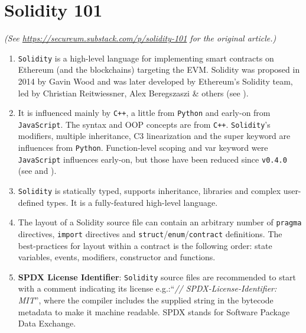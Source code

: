 \section{Solidity 101}

\textit{(See \url{https://secureum.substack.com/p/solidity-101} for the original article.)}\\

\begin{enumerate}

\item\verb|Solidity| is a high-level language for implementing smart contracts on Ethereum (and the blockchains) targeting the EVM. Solidity was proposed in 2014 by Gavin Wood and was later developed by Ethereum’s Solidity team, led by Christian Reitwiessner, Alex Beregszaszi \& others (see \cite{wikipedia_solidity}).

\item It is influenced mainly by \verb|C++|, a little from \verb|Python| and early-on from \verb|JavaScript|. The syntax and OOP concepts are from \verb|C++|. \verb|Solidity|’s modifiers, multiple inheritance, C3 linearization and the super keyword are influences from \verb|Python|. Function-level scoping and var keyword were \verb|JavaScript| influences early-on, but those have been reduced since \verb|v0.4.0| (see \cite{solidity_doc} and \cite{language_influences}).

\item\verb|Solidity| is statically typed, supports inheritance, libraries and complex user-defined types. It is a fully-featured high-level language.

\item The layout of a Solidity source file can contain an arbitrary number of \verb|pragma| directives, \verb|import| directives and \verb|struct|/\verb|enum|/\verb|contract| definitions. The best-practices for layout within a contract is the following order: state variables, events, modifiers, constructor and functions.

\item\textbf{SPDX License Identifier}: \verb|Solidity| source files are recommended to start with a comment indicating its license e.g.:“\textit{// SPDX-License-Identifier: MIT}”, where the compiler includes the supplied string in the bytecode metadata to make it machine readable. SPDX stands for Software Package Data Exchange.


\end{enumerate}
